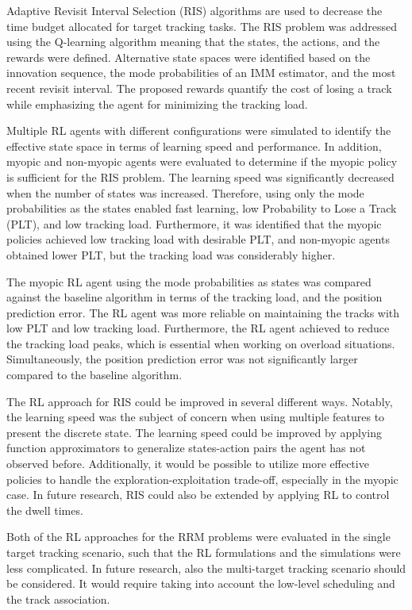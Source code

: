 \documentclass[english, 12pt, a4paper, elec, utf8, a-1b, online]{aaltothesis}
\numberwithin{equation}{section}
\begin{document}
Adaptive Revisit Interval Selection (RIS) algorithms are used to decrease the time budget allocated for target tracking tasks.
The RIS problem was addressed using the Q-learning algorithm meaning that the states, the actions, and the rewards were defined. 
Alternative state spaces were identified based on the innovation sequence, the mode probabilities of an IMM estimator, and the most recent revisit interval.
The proposed rewards quantify the cost of losing a track while emphasizing the agent for minimizing the tracking load.

Multiple RL agents with different configurations were simulated to identify the effective state space in terms of learning speed and performance.
In addition, myopic and non-myopic agents were evaluated to determine if the myopic policy is sufficient for the RIS problem.
The learning speed was significantly decreased when the number of states was increased.
Therefore, using only the mode probabilities as the states enabled fast learning, low Probability to Lose a Track (PLT), and low tracking load.
Furthermore, it was identified that the myopic policies achieved low tracking load with desirable PLT, and non-myopic agents obtained lower PLT, but the tracking load was considerably higher.

The myopic RL agent using the mode probabilities as states was compared against the baseline algorithm in terms of the tracking load, and the position prediction error.
The RL agent was more reliable on maintaining the tracks with low PLT and low tracking load. 
Furthermore, the RL agent achieved to reduce the tracking load peaks, which is essential when working on overload situations.
Simultaneously, the position prediction error was not significantly larger compared to the baseline algorithm.

The RL approach for RIS could be improved in several different ways.
Notably, the learning speed was the subject of concern when using multiple features to present the discrete state.
The learning speed could be improved by applying function approximators \cite{Sutton2018} to generalize states-action pairs the agent has not observed before.
Additionally, it would be possible to utilize more effective policies to handle the exploration-exploitation trade-off, especially in the myopic case.
In future research, RIS could also be extended by applying RL to control the dwell times.

Both of the RL approaches for the RRM problems were evaluated in the single target tracking scenario, such that the RL formulations and the simulations were less complicated. 
In future research, also the multi-target tracking scenario should be considered. 
It would require taking into account the low-level scheduling and the track association. 

\newpage
\thesisbibliography

\printbibliography
\end{document}
